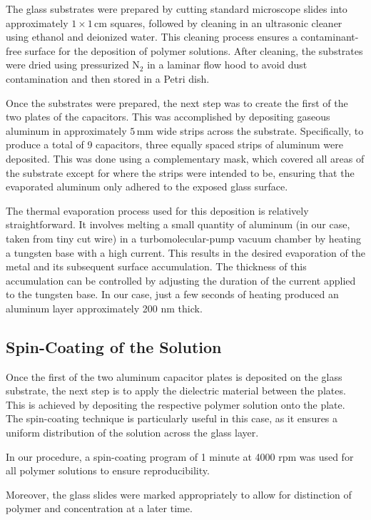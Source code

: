 The glass substrates were prepared by cutting standard microscope slides into approximately $1 \times 1 \, \text{cm}$ squares, followed by cleaning in an ultrasonic cleaner using ethanol and deionized water. This cleaning process ensures a contaminant-free surface for the deposition of polymer solutions. After cleaning, the substrates were dried using pressurized $\text{N}_2$ in a laminar flow hood to avoid dust contamination and then stored in a Petri dish.

Once the substrates were prepared, the next step was to create the first of the two plates of the capacitors. This was accomplished by depositing gaseous aluminum in approximately $5 \, \text{mm}$ wide strips across the substrate. Specifically, to produce a total of 9 capacitors, three equally spaced strips of aluminum were deposited. This was done using a complementary mask, which covered all areas of the substrate except for where the strips were intended to be, ensuring that the evaporated aluminum only adhered to the exposed glass surface.

The thermal evaporation process used for this deposition is relatively straightforward. It involves melting a small quantity of aluminum (in our case, taken from tiny cut wire) in a turbomolecular-pump vacuum chamber by heating a tungsten base with a high current. This results in the desired evaporation of the metal and its subsequent surface accumulation. The thickness of this accumulation can be controlled by adjusting the duration of the current applied to the tungsten base. In our case, just a few seconds of heating produced an aluminum layer approximately 200 nm thick.
\subsection{Spin-Coating of the Solution}

Once the first of the two aluminum capacitor plates is deposited on the glass substrate, the next step is to apply the dielectric material between the plates. This is achieved by depositing the respective polymer solution onto the plate. The spin-coating technique is particularly useful in this case, as it ensures a uniform distribution of the solution across the glass layer.

In our procedure, a spin-coating program of 1 minute at 4000 rpm was used for all polymer solutions to ensure reproducibility.

Moreover, the glass slides were marked appropriately to allow for distinction of polymer and concentration at a later time.

